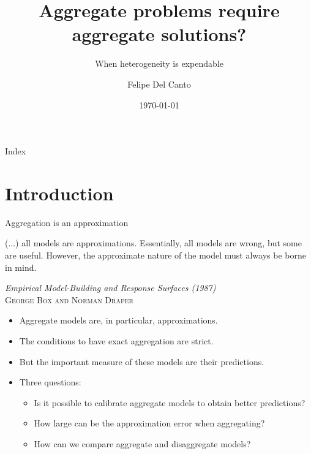 \documentclass[10pt, handout]{beamer}
\title[]{Aggregate problems require aggregate solutions?}
\subtitle{When heterogeneity is expendable}
\author{Felipe Del Canto}
\institute[]{Pontificia Universidad Católica de Chile}
\date{\today}
\begin{document}

\begin{frame}{Index}
	\tableofcontents
\end{frame}

\section{Introduction}

\begin{frame}[t]{Aggregation is an approximation}
	\begin{center}
		\epigraph{\scriptsize (...) all models are approximations. Essentially, all models are wrong, but some are useful. However, %
the approximate nature of the model must always be borne in mind.}{\scriptsize\textit{Empirical Model-Building and Response Surfaces (1987)} \\ \textsc{George Box and Norman Draper}}
	\end{center} 

\pause \vfill
	\begin{itemize}
		\item Aggregate models are, in particular, approximations. \pause \vfill
		\item The conditions to have exact aggregation are strict. \pause \vfill
		\item But the important measure of these models are their predictions. \pause \vfill
		\item Three questions: \vspace{.5ex}
			\begin{itemize}
				\item Is it possible to calibrate aggregate models to obtain better predictions? \vspace{1ex}
				\item How large can be the approximation error when aggregating? \vspace{1ex}
				\item How can we compare aggregate and disaggregate models?
			\end{itemize}
			\vfill
	\end{itemize}
\end{frame}
\end{document}
